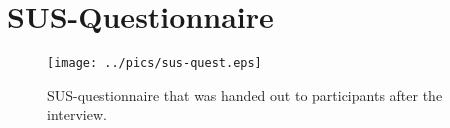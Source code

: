 \chapter{SUS-Questionnaire}
\label{appendix_sus}
\phantom{a}
\begin{figure}[h]%
\centering
	\texttt{[image: ../pics/sus-quest.eps]}%
	\caption*{SUS-questionnaire that was handed out to participants after the interview.}%
\end{figure}
